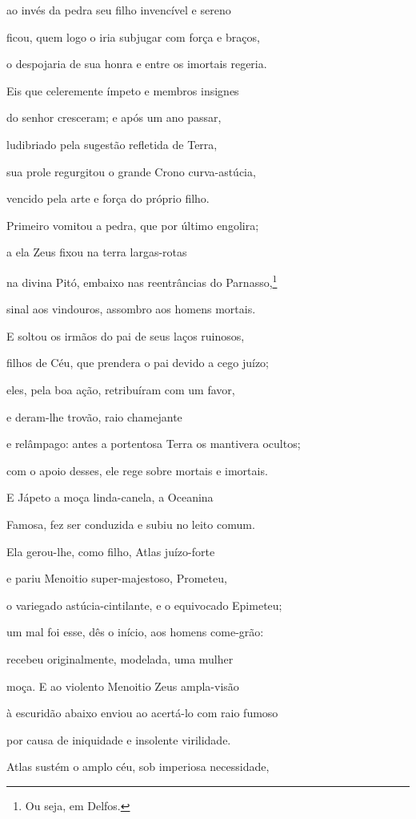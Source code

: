 \begin{pages}
\begin{Rightside}
ao invés da pedra seu filho invencível e sereno

ficou, quem logo o iria subjugar com força e braços, 

o despojaria de sua honra e entre os imortais regeria.

\quad{}Eis que celeremente ímpeto e membros insignes

do senhor cresceram; e após um ano passar,

ludibriado pela sugestão refletida de Terra,

sua prole regurgitou o grande Crono curva-astúcia, 

vencido pela arte e força do próprio filho.

Primeiro vomitou a pedra, que por último engolira;

a ela Zeus fixou na terra largas-rotas

na divina Pitó, embaixo nas reentrâncias do Parnasso,\footnote{Ou seja, em Delfos.}

sinal aos vindouros, assombro aos homens mortais. 

\quad{}E soltou os irmãos do pai de seus laços ruinosos,

filhos de Céu, que prendera o pai devido a cego juízo;

eles, pela boa ação, retribuíram com um favor,

e deram-lhe trovão, raio chamejante

e relâmpago: antes a portentosa Terra os mantivera ocultos; 

com o apoio desses, ele rege sobre mortais e imortais.

\quad{}E Jápeto a moça linda-canela, a Oceanina

Famosa, fez ser conduzida e subiu no leito comum.

Ela gerou-lhe, como filho, Atlas juízo-forte

e pariu Menoitio super-majestoso, Prometeu, 

o variegado astúcia-cintilante, e o equivocado Epimeteu;

um mal foi esse, dês o início, aos homens come-grão:

recebeu originalmente, modelada, uma mulher

moça. E ao violento Menoitio Zeus ampla-visão

à escuridão abaixo enviou ao acertá-lo com raio fumoso 

por causa de iniquidade e insolente virilidade.

Atlas sustém o amplo céu, sob imperiosa necessidade,


\end{Rightside}
\end{pages}
